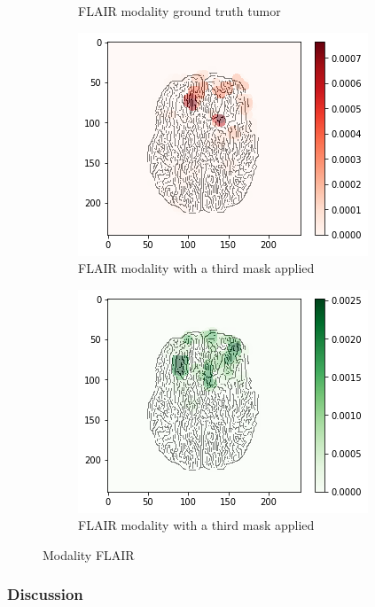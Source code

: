 \begin{figure}[H]
\begin{subfigure}[t]{.21\textwidth}
        \caption{FLAIR modality ground truth tumor}
    \end{subfigure}
    \begin{subfigure}[t]{.27\textwidth}
        \centering
        \includegraphics[width=\linewidth]{chapters/06_hdm/c_Brats18_2013_17_1_L1/58.png}
        \caption{FLAIR modality with a third mask applied}
    \end{subfigure}
    \begin{subfigure}[t]{.27\textwidth}
        \centering
        \includegraphics[width=\linewidth]{chapters/06_hdm/c_Brats18_2013_17_1_L1/59.png}
        \caption{FLAIR modality with a third mask applied}
    \end{subfigure}
    \caption{Modality FLAIR}
\end{figure}

\subsubsection{Discussion}


